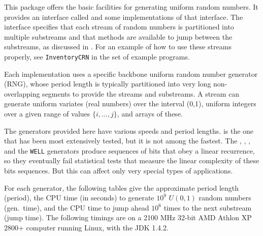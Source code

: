 
This package offers the basic facilities for generating uniform random 
numbers. It provides an interface called
and some implementations of that interface.  
The interface specifies that each stream of random numbers
is partitioned into multiple substreams and that methods are available to jump
between the substreams, as discussed in \cite{rLEC91a,rLEC97d,rLEC02a}.
For an example of how to use these streams properly, see  
\texttt{InventoryCRN} in the set of example programs.

Each implementation uses a specific backbone 
uniform random number generator (RNG), whose period length is typically
partitioned into very long non-overlapping segments to provide the 
streams and substreams.
A stream can generate uniform variates (real numbers) over the interval (0,1),
uniform integers over a given range of values $\{i,\dots,j\}$,
and arrays of these.

The generators provided here have various speeds and period lengths.
 is the one that
 has been most extensively tested, but it is not among the fastest. 
The , ,
 , and the \texttt{WELL} generators produce sequences
of bits that obey a linear recurrence, so they eventually fail statistical 
tests that measure the linear complexity of these bits sequences.
But this can affect only very special types of applications.

For each generator, the following tables give
the approximate period length (period),
the CPU time (in seconds) to generate $10^9$ $U(0,1)$ random numbers 
(gen.\ time), and the CPU time to jump ahead $10^6$ times 
to the next substream (jump time).
The following timings are on a 2100 MHz 32-bit AMD Athlon XP 2800+
computer running Linux, with the JDK 1.4.2.

